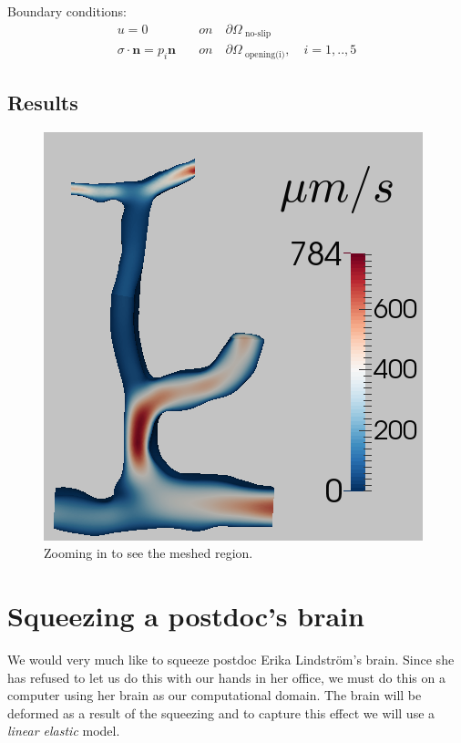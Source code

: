 \documentclass[epsfig,11pt]{article}
\begin{document}
Boundary conditions:
\begin{align*}
u = 0 \quad &on \quad \partial \Omega_{\text{ no-slip}} \\
\sigma \cdot \mathbf{n} = p_i\mathbf{n} \quad &on \quad \partial \Omega_\text{ opening(i)},\quad i=1,..,5
\end{align*}

\subsection{Results}

\begin{figure}[h!] 
\begin{center}
  \includegraphics[scale=0.4]{result.png}
  \end{center}
  \caption{Zooming in to see the meshed region.}
\end{figure}


\section{Squeezing a postdoc's brain}

We would very much like to squeeze postdoc Erika Lindström's brain. Since she has refused to let us do this with our hands in her office, we must do this on a computer using her brain as our computational domain. The brain will be deformed as a result of the squeezing and to capture this effect we will use a \emph{linear elastic} model. 
\end{document}
